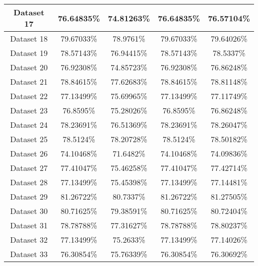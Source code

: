 \begin{center}
\begin{tabular}{ |c||c|c|c|c| }
    \hline
    Dataset 17 & 76.64835\% & 74.81263\% & 76.64835\% & 76.57104\%\\
    \hline
    Dataset 18 & 79.67033\% & 78.9761\% & 79.67033\% & 79.64026\%\\
    \hline
    Dataset 19 & 78.57143\% & 76.94415\% & 78.57143\% & 78.5337\%\\
    \hline
    Dataset 20 & 76.92308\% & 74.85723\% & 76.92308\% & 76.86248\%\\
    \hline
    Dataset 21 & 78.84615\% & 77.62683\% & 78.84615\% & 78.81148\%\\
    \hline
    Dataset 22 & 77.13499\% & 75.69965\% & 77.13499\% & 77.11749\%\\
    \hline
    Dataset 23 & 76.8595\% & 75.28026\% & 76.8595\% & 76.86248\%\\
    \hline
    Dataset 24 & 78.23691\% & 76.51369\% & 78.23691\% & 78.26047\%\\
    \hline
    Dataset 25 & 78.5124\% & 78.20728\% & 78.5124\% & 78.50182\%\\
    \hline
    Dataset 26 & 74.10468\% & 71.6482\% & 74.10468\% & 74.09836\%\\
    \hline
    Dataset 27 & 77.41047\% & 75.46258\% & 77.41047\% & 77.42714\%\\
    \hline
    Dataset 28 & 77.13499\% & 75.45398\% & 77.13499\% & 77.14481\%\\
    \hline
    Dataset 29 & 81.26722\% & 80.7337\% & 81.26722\% & 81.27505\%\\
    \hline
    Dataset 30 & 80.71625\% & 79.38591\% & 80.71625\% & 80.72404\%\\
    \hline
    Dataset 31 & 78.78788\% & 77.31627\% & 78.78788\% & 78.80237\%\\
    \hline
    Dataset 32 & 77.13499\% & 75.2633\% & 77.13499\% & 77.14026\%\\
    \hline
    Dataset 33 & 76.30854\% & 75.76339\% & 76.30854\% & 76.30692\%\\
    \hline
\end{tabular}
\end{center}

\newpage

